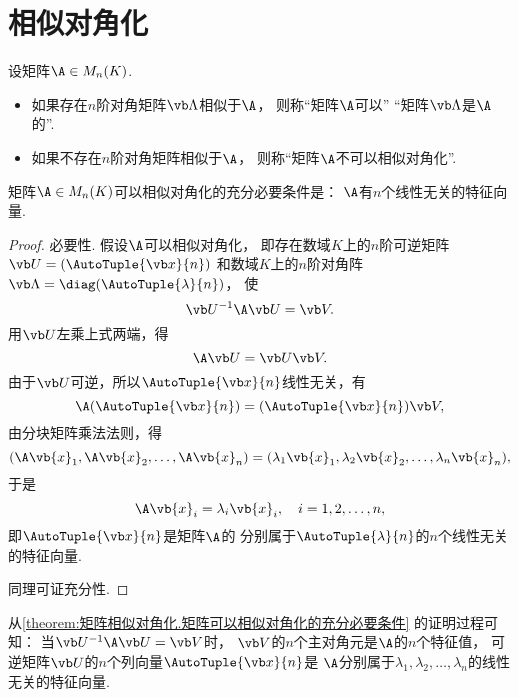 \section{相似对角化}
\begin{definition}
设矩阵\(\A \in M_n(K)\).
\begin{itemize}
	\item 如果存在\(n\)阶对角矩阵\(\vb\Lambda\)相似于\(\A\)，
	则称“矩阵\(\A\)可以”
	“矩阵\(\vb\Lambda\)是\(\A\)的”.
	\item 如果不存在\(n\)阶对角矩阵相似于\(\A\)，
	则称“矩阵\(\A\)不可以{相似对角化}”.
\end{itemize}
\end{definition}

\begin{theorem}\label{theorem:矩阵相似对角化.矩阵可以相似对角化的充分必要条件}
矩阵\(\A \in M_n(K)\)可以相似对角化的充分必要条件是：
\(\A\)有\(n\)个线性无关的特征向量.
\begin{proof}
必要性.
假设\(\A\)可以相似对角化，
即存在数域\(K\)上的\(n\)阶可逆矩阵\(\P=(\AutoTuple{\x}{n})\)
和数域\(K\)上的\(n\)阶对角阵\(\vb\Lambda=\diag(\AutoTuple{\lambda}{n})\)，
使\[
	\P^{-1}\A\P=\V.
\]
用\(\P\)左乘上式两端，得\[
	\A\P=\P\V.
\]
由于\(\P\)可逆，所以\(\AutoTuple{\x}{n}\)线性无关，有\[
	\A(\AutoTuple{\x}{n})
	=(\AutoTuple{\x}{n})\V,
\]
由分块矩阵乘法法则，得\[
	(\A\vb{x}_1,\A\vb{x}_2,\dotsc,\A\vb{x}_n)
	=(\lambda_1\vb{x}_1,\lambda_2\vb{x}_2,\dotsc,\lambda_n\vb{x}_n),
\]
于是\[
	\A\vb{x}_i=\lambda_i\vb{x}_i,
	\quad i=1,2,\dotsc,n,
\]
即\(\AutoTuple{\x}{n}\)是矩阵\(\A\)的
分别属于\(\AutoTuple{\lambda}{n}\)的\(n\)个线性无关的特征向量.

同理可证充分性.
\end{proof}
\end{theorem}
\begin{remark}
从\cref{theorem:矩阵相似对角化.矩阵可以相似对角化的充分必要条件} 的证明过程可知：
{\color{red}当\(\P^{-1}\A\P=\V\)时，
\(\V\)的\(n\)个主对角元是\(\A\)的\(n\)个特征值，
可逆矩阵\(\P\)的\(n\)个列向量\(\AutoTuple{\x}{n}\)是
\(\A\)分别属于\(\lambda_1,\lambda_2,\dotsc,\lambda_n\)的线性无关的特征向量.}
\end{remark}

